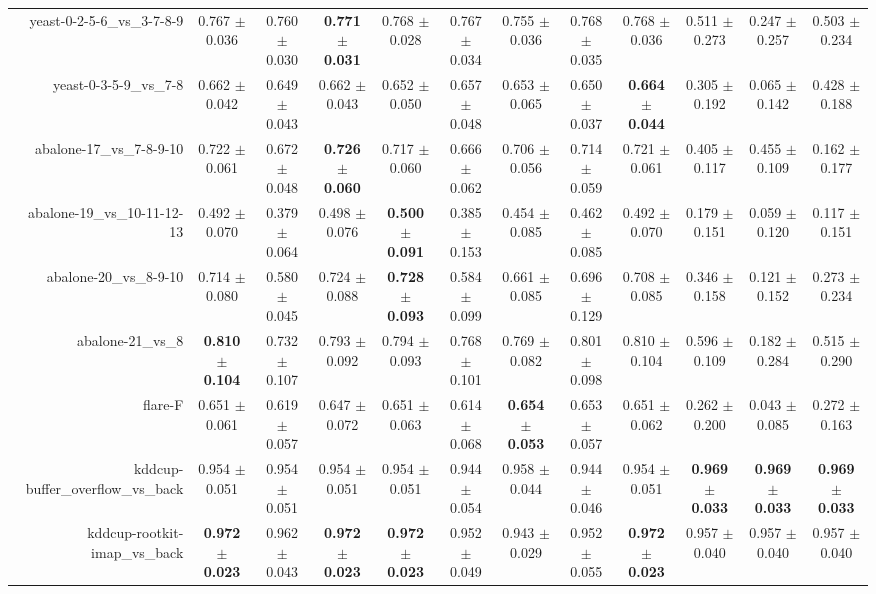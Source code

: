 \begin{table}[!ht]
{\begin{tabular}{r c c c c c c c c c c c}
yeast-0-2-5-6\_vs\_3-7-8-9 & 0.767 $\pm$ 0.036 & 0.760 $\pm$ 0.030 & \textbf{0.771 $\pm$ 0.031} & 0.768 $\pm$ 0.028 & 0.767 $\pm$ 0.034 & 0.755 $\pm$ 0.036 & 0.768 $\pm$ 0.035 & 0.768 $\pm$ 0.036 & 0.511 $\pm$ 0.273 & 0.247 $\pm$ 0.257 & 0.503 $\pm$ 0.234 \\
yeast-0-3-5-9\_vs\_7-8 & 0.662 $\pm$ 0.042 & 0.649 $\pm$ 0.043 & 0.662 $\pm$ 0.043 & 0.652 $\pm$ 0.050 & 0.657 $\pm$ 0.048 & 0.653 $\pm$ 0.065 & 0.650 $\pm$ 0.037 & \textbf{0.664 $\pm$ 0.044} & 0.305 $\pm$ 0.192 & 0.065 $\pm$ 0.142 & 0.428 $\pm$ 0.188 \\
abalone-17\_vs\_7-8-9-10 & 0.722 $\pm$ 0.061 & 0.672 $\pm$ 0.048 & \textbf{0.726 $\pm$ 0.060} & 0.717 $\pm$ 0.060 & 0.666 $\pm$ 0.062 & 0.706 $\pm$ 0.056 & 0.714 $\pm$ 0.059 & 0.721 $\pm$ 0.061 & 0.405 $\pm$ 0.117 & 0.455 $\pm$ 0.109 & 0.162 $\pm$ 0.177 \\
abalone-19\_vs\_10-11-12-13 & 0.492 $\pm$ 0.070 & 0.379 $\pm$ 0.064 & 0.498 $\pm$ 0.076 & \textbf{0.500 $\pm$ 0.091} & 0.385 $\pm$ 0.153 & 0.454 $\pm$ 0.085 & 0.462 $\pm$ 0.085 & 0.492 $\pm$ 0.070 & 0.179 $\pm$ 0.151 & 0.059 $\pm$ 0.120 & 0.117 $\pm$ 0.151 \\
abalone-20\_vs\_8-9-10 & 0.714 $\pm$ 0.080 & 0.580 $\pm$ 0.045 & 0.724 $\pm$ 0.088 & \textbf{0.728 $\pm$ 0.093} & 0.584 $\pm$ 0.099 & 0.661 $\pm$ 0.085 & 0.696 $\pm$ 0.129 & 0.708 $\pm$ 0.085 & 0.346 $\pm$ 0.158 & 0.121 $\pm$ 0.152 & 0.273 $\pm$ 0.234 \\
abalone-21\_vs\_8 & \textbf{0.810 $\pm$ 0.104} & 0.732 $\pm$ 0.107 & 0.793 $\pm$ 0.092 & 0.794 $\pm$ 0.093 & 0.768 $\pm$ 0.101 & 0.769 $\pm$ 0.082 & 0.801 $\pm$ 0.098 & 0.810 $\pm$ 0.104 & 0.596 $\pm$ 0.109 & 0.182 $\pm$ 0.284 & 0.515 $\pm$ 0.290 \\
flare-F & 0.651 $\pm$ 0.061 & 0.619 $\pm$ 0.057 & 0.647 $\pm$ 0.072 & 0.651 $\pm$ 0.063 & 0.614 $\pm$ 0.068 & \textbf{0.654 $\pm$ 0.053} & 0.653 $\pm$ 0.057 & 0.651 $\pm$ 0.062 & 0.262 $\pm$ 0.200 & 0.043 $\pm$ 0.085 & 0.272 $\pm$ 0.163 \\
kddcup-buffer\_overflow\_vs\_back & 0.954 $\pm$ 0.051 & 0.954 $\pm$ 0.051 & 0.954 $\pm$ 0.051 & 0.954 $\pm$ 0.051 & 0.944 $\pm$ 0.054 & 0.958 $\pm$ 0.044 & 0.944 $\pm$ 0.046 & 0.954 $\pm$ 0.051 & \textbf{0.969 $\pm$ 0.033} & \textbf{0.969 $\pm$ 0.033} & \textbf{0.969 $\pm$ 0.033} \\
kddcup-rootkit-imap\_vs\_back & \textbf{0.972 $\pm$ 0.023} & 0.962 $\pm$ 0.043 & \textbf{0.972 $\pm$ 0.023} & \textbf{0.972 $\pm$ 0.023} & 0.952 $\pm$ 0.049 & 0.943 $\pm$ 0.029 & 0.952 $\pm$ 0.055 & \textbf{0.972 $\pm$ 0.023} & 0.957 $\pm$ 0.040 & 0.957 $\pm$ 0.040 & 0.957 $\pm$ 0.040 \\

\end{tabular}}
\end{table}
